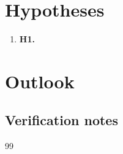 \documentclass[10pt]{article}
\newcommand{\doilink}[1]{\href{https://doi.org/#1}{\texttt{doi:\detokenize{#1}}}}
\begin{document}
\section{Hypotheses}
\begin{enumerate}\setlength\itemsep{2pt}
  \item \textbf{H1.} %
\end{enumerate}

\section{Outlook}

\subsection*{Verification notes}

\begin{thebibliography}{99}\small
\end{thebibliography}
\end{document}
